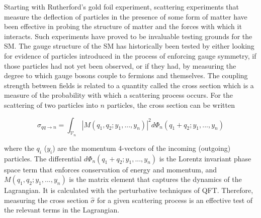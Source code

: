 
Starting with Rutherford's gold foil experiment, scattering
experiments that measure the deflection of particles in the presence
of some form of matter have been effective in probing the structure of
matter and the forces with which it interacts. Such experiments have
proved to be invaluable testing grounds for the SM. The gauge
structure of the SM has historically been tested by either looking for
evidence of particles introduced in the process of enforcing gauge
symmetry, if those particles had not yet been observed, or if they
had, by measuring the degree to which gauge bosons couple to
fermions and themselves. The coupling strength between fields is
related to a quantity called the cross section which is a measure of
the probability with which a scattering process occurs. For the
scattering of two particles into $n$ particles, the cross section can
be written

\begin{equation}
\hat{\sigma}_{qq\rightarrow{n}} = \int_{\mathscr{V}_n} |M(q_1,q_2;y_1,...,y_n)|^2
d\Phi_n(q_1+q_2;y_1,...,y_n)
\label{chapter:theory:equation:cross_section}
\end{equation}

\noindent
where the $q_i$ ($y_i$) are the momentum 4-vectors of the incoming
(outgoing) particles. The differential $d\Phi_n(q_1+q_2;y_1,...,y_n)$ is the Lorentz
invariant phase space term that enforces conservation of energy and
momentum, and $M(q_1,q_2;y_1,...,y_n)$ is the matrix element that
captures the dynamics of the Lagrangian. It is calculated with the
perturbative techniques of QFT. Therefore, measuring the cross
section $\hat{\sigma}$ for a given scattering process is an effective
test of the relevant terms in the Lagrangian. 

